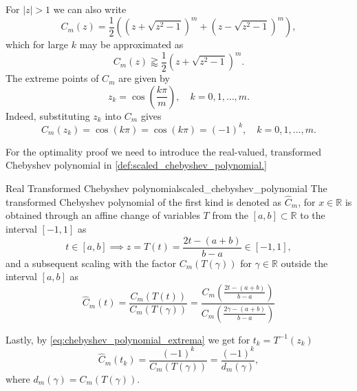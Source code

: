 For $|z|>1$ we can also write
\begin{equation}
  C_m(z) = \frac{1}{2}\left(\left(z + \sqrt{z^2 - 1}\right)^m + \left(z - \sqrt{z^2 - 1}\right)^m\right),
  \label{eq:chebyshev_polynomial_explicit}
\end{equation}
which for large $k$ may be approximated as
\begin{equation}
  C_m(z) \gtrapprox \frac{1}{2}\left(z + \sqrt{z^2 - 1}\right)^m.
  \label{eq:chebyshev_polynomial_approximation}
\end{equation}
The extreme points of $C_m$ are given by
\begin{equation}
  z_k = \cos\left(\frac{k \pi}{m}\right), \quad k = 0, 1, \dots, m.
  \label{eq:chebyshev_polynomial_extreme_points}
\end{equation}
Indeed, substituting $z_k$ into $C_m$ gives 
\begin{equation}
  C_m(z_k) = \cos(k \pi) = \cos(k \pi) = (-1)^k, \quad k = 0, 1, \dots, m.
  \label{eq:chebyshev_polynomial_extrema}
\end{equation}
 
For the optimality proof we need to introduce the real-valued, transformed Chebyshev polynomial in \cref{def:scaled_chebyshev_polynomial.}
\begin{APPfancydef}{Real Transformed Chebyshev polynomial}{scaled_chebyshev_polynomial}
  The transformed Chebyshev polynomial of the first kind is denoted as $\hat{C}_m$, for $x\in\mathbb{R}$ is obtained through an affine change of variables $T$ from the $[a, b] \subset \mathbb{R}$ to the interval $[-1, 1]$ as
  \[
    t \in [a,b] \implies z = T(t) = \frac{2t - (a + b)}{b - a} \in [-1, 1],
  \]
  and a subsequent scaling with the factor $C_m(T(\gamma))$ for $\gamma\in\mathbb{R}$ outside the interval $[a, b]$ as
  \[
    \hat{C}_m(t) = \frac{C_m(T(t))}{C_m(T(\gamma))} = \frac{C_m\left(\frac{2t - (a + b)}{b - a}\right)}{C_m\left(\frac{2\gamma - (a + b)}{b - a}\right)}
  \]
\end{APPfancydef}

Lastly, by \cref{eq:chebyshev_polynomial_extrema} we get for $t_k = T^{-1}(z_k)$
\begin{equation}
    \hat{C}_m(t_k) = \frac{(-1)^k}{C_m(T(\gamma))} = \frac{(-1)^k}{d_m(\gamma)},
    \label{eq:chebyshev_polynomial_extrema_scaled}
\end{equation}
where $d_m(\gamma) = C_m(T(\gamma))$. 

